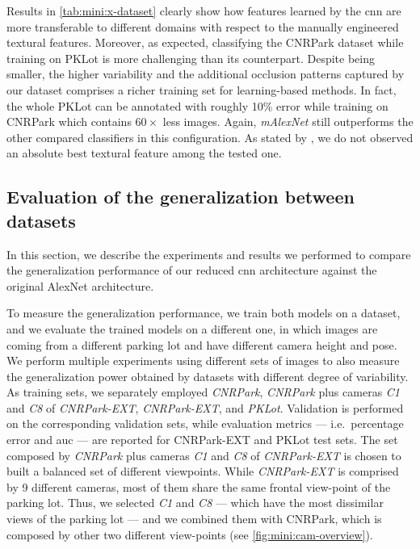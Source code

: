 Results in \ref{tab:mini:x-dataset} clearly show how features learned by the \gls{cnn} are more transferable to different domains with respect to the manually engineered textural features.
Moreover, as expected, classifying the CNRPark dataset while training on PKLot is more challenging than its counterpart.
Despite being smaller, the higher variability and the additional occlusion patterns captured by our dataset comprises a richer training set for learning-based methods.
In fact, the whole PKLot can be annotated with roughly 10\% error while training on CNRPark which contains $60\times$ less images.
Again, \emph{mAlexNet} still outperforms the other compared classifiers in this configuration.
As stated by \citet{de2015pklot}, we do not observed an absolute best textural feature among the tested one.


\subsection{Evaluation of the generalization between datasets}
\label{sub:mini:generalization}

In this section, we describe the experiments and results we performed to compare the generalization performance of our reduced \gls{cnn} architecture against the original AlexNet architecture.

To measure the generalization performance, we train both models on a dataset, and we evaluate the trained models on a different one, in which images are coming from a different parking lot and have different camera height and pose.
We perform multiple experiments using different sets of images to also measure the generalization power obtained by datasets with different degree of variability.
As training sets, we separately employed \emph{CNRPark}, \emph{CNRPark} plus cameras \emph{C1} and \emph{C8} of \emph{CNRPark-EXT}, \emph{CNRPark-EXT}, and \emph{PKLot}.
Validation is performed on the corresponding validation sets, while evaluation metrics --- i.e.\ percentage error and \gls{auc} --- are reported for CNRPark-EXT and PKLot test sets.
The set composed by \emph{CNRPark} plus cameras \emph{C1} and \emph{C8} of \emph{CNRPark-EXT} is chosen to built a balanced set of different viewpoints.
While \emph{CNRPark-EXT} is comprised by 9 different cameras, most of them share the same frontal view-point of the parking lot.
Thus, we selected \emph{C1} and \emph{C8} --- which have the most dissimilar views of the parking lot --- and we combined them with CNRPark, which is composed by other two different view-points (see \ref{fig:mini:cam-overview}).

